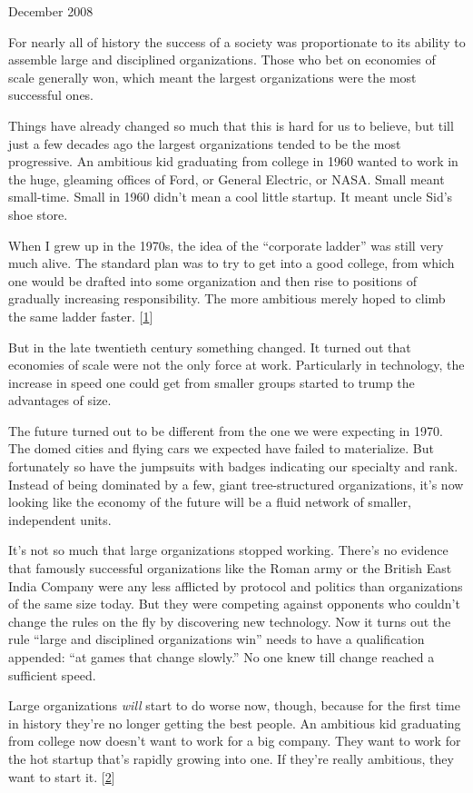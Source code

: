 December 2008

For nearly all of history the success of a society was proportionate to
its ability to assemble large and disciplined organizations. Those who
bet on economies of scale generally won, which meant the largest
organizations were the most successful ones.

Things have already changed so much that this is hard for us to believe,
but till just a few decades ago the largest organizations tended to be
the most progressive. An ambitious kid graduating from college in 1960
wanted to work in the huge, gleaming offices of Ford, or General
Electric, or NASA. Small meant small-time. Small in 1960 didn't mean a
cool little startup. It meant uncle Sid's shoe store.

When I grew up in the 1970s, the idea of the ``corporate ladder'' was
still very much alive. The standard plan was to try to get into a good
college, from which one would be drafted into some organization and then
rise to positions of gradually increasing responsibility. The more
ambitious merely hoped to climb the same ladder faster.
{[}\hyperref[f1n]{1}{]}

But in the late twentieth century something changed. It turned out that
economies of scale were not the only force at work. Particularly in
technology, the increase in speed one could get from smaller groups
started to trump the advantages of size.

The future turned out to be different from the one we were expecting in
1970. The domed cities and flying cars we expected have failed to
materialize. But fortunately so have the jumpsuits with badges
indicating our specialty and rank. Instead of being dominated by a few,
giant tree-structured organizations, it's now looking like the economy
of the future will be a fluid network of smaller, independent units.

It's not so much that large organizations stopped working. There's no
evidence that famously successful organizations like the Roman army or
the British East India Company were any less afflicted by protocol and
politics than organizations of the same size today. But they were
competing against opponents who couldn't change the rules on the fly by
discovering new technology. Now it turns out the rule ``large and
disciplined organizations win'' needs to have a qualification appended:
``at games that change slowly.'' No one knew till change reached a
sufficient speed.

Large organizations \emph{will} start to do worse now, though, because
for the first time in history they're no longer getting the best people.
An ambitious kid graduating from college now doesn't want to work for a
big company. They want to work for the hot startup that's rapidly
growing into one. If they're really ambitious, they want to start it.
{[}\hyperref[f2n]{2}{]}

